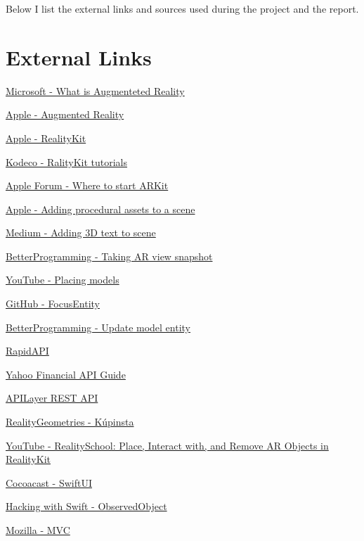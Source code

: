 \documentclass{report}
\begin{document}
Below I list the external links and sources used during the project and the report.

\section{External Links}

\hyperlink{https://dynamics.microsoft.com/en-us/mixed-reality/guides/what-is-augmented-reality-ar/}{Microsoft - What is Augmenteted Reality}

\hyperlink{https://developer.apple.com/augmented-reality/}{Apple - Augmented Reality}

\hyperlink{https://developer.apple.com/documentation/realitykit/}{Apple - RealityKit}

\hyperlink{https://www.kodeco.com/books/apple-augmented-reality-by-tutorials/v1.0/chapters/iii-introduction}{Kodeco - RalityKit tutorials}

\hyperlink{https://developer.apple.com/forums/thread/658300}{Apple Forum - Where to start ARKit}

\hyperlink{https://developer.apple.com/documentation/realitykit/adding-procedural-assets-to-a-scene}{Apple - Adding procedural assets to a scene}

\hyperlink{https://coledennis.medium.com/tutorial-generating-3d-text-with-realitykit-in-a-swiftui-app-fa2a50403012}{Medium - Adding 3D text to scene}

\hyperlink{https://betterprogramming.pub/take-an-arview-snapshot-in-realitykit-93b620cf99b3}{BetterProgramming - Taking AR view snapshot}

\hyperlink{https://www.youtube.com/watch?v=9R_G0EI-UoI}{YouTube - Placing models}

\hyperlink{https://github.com/maxxfrazer/FocusEntity}{GitHub - FocusEntity}

\hyperlink{https://betterprogramming.pub/how-to-add-text-to-an-arview-in-an-ios-application-tutorial-f3f746f4dc1f}{BetterProgramming - Update model entity}

\hyperlink{https://rapidapi.com/apidojo/api/yahoo-finance1}{RapidAPI}

\hyperlink{https://algotrading101.com/learn/yahoo-finance-api-guide/}{Yahoo Financial API Guide}

\hyperlink{https://apilayer.com/marketplace/exchangerates_data-api}{APILayer REST API}

\hyperlink{https://github.com/maxxfrazer/RealityGeometries}{RealityGeometries - Kúpinsta}

\hyperlink{https://www.youtube.com/watch?v=itGRaAryUxA}{YouTube - RealitySchool: Place, Interact with, and Remove AR Objects in RealityKit}

\hyperlink{https://cocoacasts.com/swiftui-fundamentals-what-is-swiftui}{Cocoacast - SwiftUI}

\hyperlink{https://www.hackingwithswift.com/quick-start/swiftui/how-to-use-observedobject-to-manage-state-from-external-objects}{Hacking with Swift - ObservedObject}

\hyperlink{https://developer.mozilla.org/en-US/docs/Glossary/MVC}{Mozilla - MVC}
\end{document}

